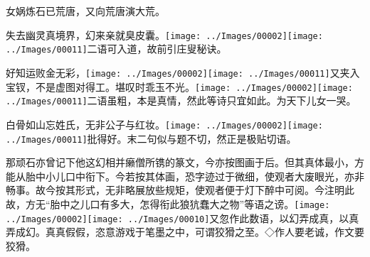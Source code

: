 女娲炼石已荒唐，又向荒唐演大荒。

失去幽灵真境界，幻来亲就臭皮囊。{\texttt{[image: ../Images/00002]}\texttt{[image: ../Images/00011]}\footnotesize \kaishu 二语可入道，故前引庄叟秘诀。}

好知运败金无彩，{\texttt{[image: ../Images/00002]}\texttt{[image: ../Images/00011]}\footnotesize \kaishu 又夹入宝钗，不是虚图对得工。}堪叹时乖玉不光。{\texttt{[image: ../Images/00002]}\texttt{[image: ../Images/00011]}\footnotesize \kaishu 二语虽粗，本是真情，然此等诗只宜如此。为天下儿女一哭。}

白骨如山忘姓氏，无非公子与红妆。{\texttt{[image: ../Images/00002]}\texttt{[image: ../Images/00011]}\footnotesize \kaishu 批得好。末二句似与题不切，然正是极贴切语。}

那顽石亦曾记下他这幻相并癞僧所镌的篆文，今亦按图画于后。但其真体最小，方能从胎中小儿口中衔下。今若按其体画，恐字迹过于微细，使观者大废眼光，亦非畅事。故今按其形式，无非略展放些规矩，使观者便于灯下醉中可阅。今注明此故，方无``胎中之儿口有多大，怎得衔此狼犺蠢大之物''等语之谤。{\texttt{[image: ../Images/00002]}\texttt{[image: ../Images/00010]}\footnotesize \kaishu 又忽作此数语，以幻弄成真，以真弄成幻。真真假假，恣意游戏于笔墨之中，可谓狡猾之至。◇作人要老诚，作文要狡猾。}

\begin{figure}[htbp]
	\centering %
	
	\label{fig:1} %
\end{figure}
%
%
%
%
%
%
%
%
%

